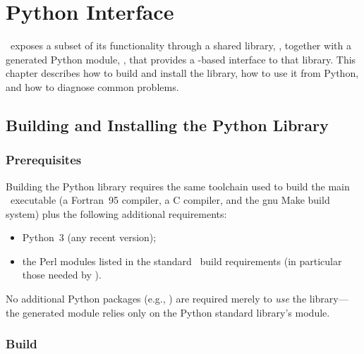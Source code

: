 \chapter{Python Interface}\label{sec:pythonInterface}

\glc\ exposes a subset of its functionality through a shared library, , together with a generated Python module, , that provides a -based interface to that library. This chapter describes how to build and install the library, how to use it from Python, and how to diagnose common problems.

\section{Building and Installing the Python Library}\label{sec:pythonInterface:build}

\subsection{Prerequisites}\label{sec:pythonInterface:build:prerequisites}

Building the Python library requires the same toolchain used to build the main \glc\ executable (a Fortran~95 compiler, a C compiler, and the \gls{gnu} Make build system) plus the following additional requirements:
\begin{itemize}
  \item Python~3 (any recent version);
  \item the Perl modules listed in the standard \glc\ build requirements (in particular those needed by ).
\end{itemize}

No additional Python packages (e.g., ) are required merely to \emph{use} the library---the generated module relies only on the Python standard library's  module.

\subsection{Build}\label{sec:pythonInterface:build:build}

